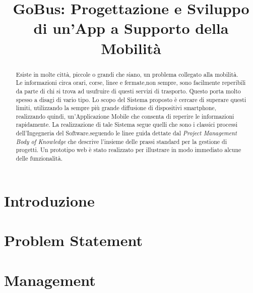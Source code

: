 \documentclass[conference]{IEEEtran}
\begin{document}
\title{GoBus: Progettazione e Sviluppo di un'App a Supporto della Mobilit\`{a}}

\author{}


\maketitle


\begin{abstract}
Esiste in molte citt\`{a}, piccole o grandi che siano, un problema collegato alla mobilit\`{a}. Le informazioni circa orari, corse, linee e fermate,non sempre, sono facilmente reperibili da parte di chi si trova ad usufruire di questi servizi di trasporto. Questo porta molto spesso a disagi di vario tipo. Lo scopo del Sistema proposto \`{e} cercare di superare questi limiti, utilizzando la sempre pi\`{u} grande diffusione di dispositivi smartphone, realizzando quindi, un\rq Applicazione Mobile che consenta di reperire le informazioni rapidamente. La realizzazione di tale Sistema segue quelli che sono i classici processi dell\rq Ingegneria del Software.seguendo le linee guida dettate dal \emph{Project Management Body of Knowledge} che descrive l’insieme delle prassi standard per la gestione di progetti. Un prototipo web \`{e} stato realizzato per illustrare in modo immediato alcune delle funzionalit\`{a}.


\end{abstract}

\IEEEpeerreviewmaketitle



\section{Introduzione}
\label{intro}


\section{Problem Statement}
\label{PS}

\section{Management}
\label{management}

\end{document}
